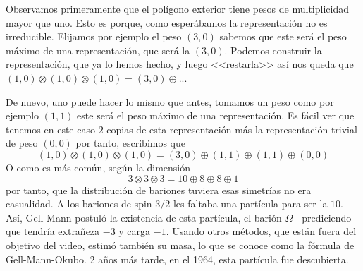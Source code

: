 \documentclass[12pt]{article}
\begin{document}
Observamos primeramente que el polígono exterior tiene pesos de multiplicidad mayor que uno. Esto es porque, como esperábamos la representación no es irreducible. Elijamos por ejemplo el peso $(3,0)$ sabemos que este será el peso máximo de una representación, que será la $(3,0)$. Podemos construir la representación, que ya lo hemos hecho, y luego <<restarla>> así nos queda que $(1,0)\otimes (1,0) \otimes (1,0) = (3,0) \oplus$...
\begin{center}
\end{center}
De nuevo, uno puede hacer lo mismo que antes, tomamos un peso como por ejemplo $(1,1)$ este será el peso máximo de una representación. Es fácil ver que tenemos en este caso $2$ copias de esta representación más la representación trivial de peso $(0,0)$ por tanto, escribimos que 
$$(1,0)\otimes (1,0) \otimes (1,0) = (3,0) \oplus (1,1) \oplus (1,1) \oplus (0,0)$$
O como es más común, según la dimensión 
$$3\otimes 3\otimes 3 = 10\oplus 8\oplus 8 \oplus 1$$ por tanto, que la distribución de bariones tuviera esas simetrías no era casualidad. A los bariones de spin $3/2$ les faltaba una partícula para ser la $10$. Así, Gell-Mann postuló la existencia de esta partícula, el barión $\Omega^{-}$ prediciendo que tendría extrañeza $-3$ y carga $-1$. Usando otros métodos, que están fuera del objetivo del video, estimó también su masa, lo que se conoce como la fórmula de Gell-Mann-Okubo. 2 años más tarde, en el 1964, esta partícula fue descubierta.
\end{document}
